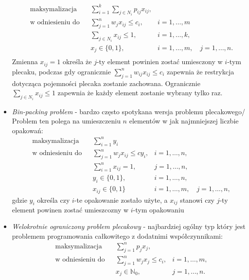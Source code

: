 \begin{itemize}
\begin{equation}
\begin{aligned}
      & \textrm{maksymalizacja} & & \sum_{i=1}^k \sum_{j \in N_i} p_{ij}x_{ij}, \\
      & \textrm{w odniesieniu do} & & \sum_{j=1}^n  w_jx_{ij} \le c_i, & i =1,\dots,m \\
      &&& \sum_{j \in N_i} x_{ij} \le 1, & i =1,\dots,k, \\
      &&& x_j \in\{0,1\},& i = 1,\dots,m, \quad j =1,\dots,n. \\
    \end{aligned}
  \end{equation}
  Zmienna $x_{ij} = 1$ określa że $j$-ty element powinien zostać umiesczony w $i$-tym plecaku, podczas gdy ogranicznie $\sum_{j=1}^n  w_{ij}x_{ij} \le c_i$ zapewnia że restrykcja dotycząca pojemności plecaka zostanie zachowana. Ogranicznie $\sum_{j \in N_i} x_{ij} \le 1$ zapewnia że każdy element zostanie wybrany tylko raz.
  \item \textit{Bin-packing problem} - bardzo często spotykana wersja problemu plecakowego/ Problem ten polega na umieszczeniu $n$ elementów w jak najmniejszej liczbie opakowań:
  \begin{equation}\label{binPacking}
    \begin{aligned}
      & \textrm{maksymalizacja} & & \sum_{i=1}^n y_i \\
      & \textrm{w odniesieniu do} & & \sum_{j=1}^n w_jx_{ij} \le cy_i, & i=1,\dots,n, \\
      &&& \sum_{i=1}^n x_{ij} = 1, & j=1,\dots,n, \\
      &&& y_i \in \{0,1\}, & i=1,\dots,n, \\
      &&& x_{ij} \in \{0,1\} & i=1,\dots,m, \quad j = 1,\dots,n,
    \end{aligned}
  \end{equation}
  gdzie $y_i$ określa czy $i$-te opakowanie zostało użyte, a $x_{ij}$ stanowi czy $j$-ty element powinen zostać umieszcozny w $i$-tym opakowaniu
  \item \textit{Welokrotnie ograniczony problem plecakowy} - najbardziej ogólny typ który jest problemem programowania całkowitego z dodatnimi współczynnikami:
  \begin{equation}\label{generalKnapsack}
    \begin{aligned}
      & \textrm{maksymalizacja} & & \sum_{j=1}^n p_jx_j, \\
      & \textrm{w odniesieniu do} & & \sum_{j=1}^n w_jx_j \le c_i, & i=1,\dots,m, \\
      &&& x_j \in \mathbb{N}_0, & j = 1,\dots,n. \\
    \end{aligned}
  \end{equation}
\end{itemize}


